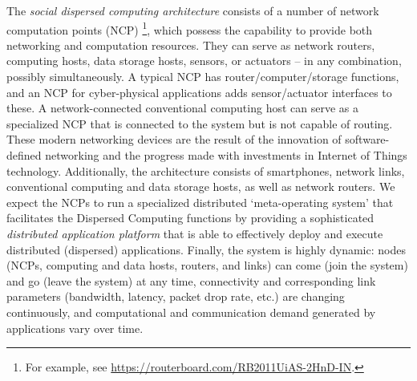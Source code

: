 \documentclass[12pt,letterpaper]{article}
\begin{document}
The \emph{social dispersed computing architecture} consists of a number of network computation points (NCP) \footnote{For example, see \url{https://routerboard.com/RB2011UiAS-2HnD-IN}.}, which possess the capability to provide both networking and computation resources. They can serve as network routers, computing hosts, data storage hosts, sensors, or actuators -- in any combination, possibly simultaneously. A typical NCP has router/computer/storage functions, and an NCP for cyber-physical applications adds sensor/actuator interfaces to these. A network-connected conventional computing host can serve as a specialized NCP that is connected to the system but is not capable of routing. These modern networking devices are the result of the innovation of software-defined networking and the progress made with investments in Internet of Things technology. Additionally, the architecture consists of smartphones, network links, conventional computing and data storage hosts, as well as network routers. We expect the NCPs to run a specialized distributed `meta-operating system'  that facilitates the Dispersed Computing functions by providing a sophisticated \textit{distributed application platform} that is able to effectively deploy and execute distributed (dispersed) applications.  Finally, the system is highly dynamic: nodes (NCPs, computing and data hosts, routers, and links) can come (join the system) and go (leave the system) at any time, connectivity and corresponding link parameters (bandwidth, latency, packet drop rate, etc.) are changing continuously, and computational and communication demand generated by applications vary over time. 
\end{document}
